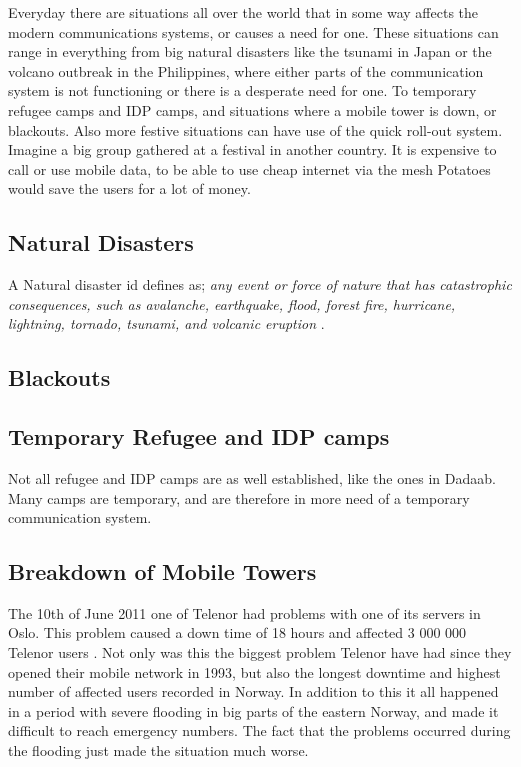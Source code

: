 Everyday there are situations all over the world that in some way affects the modern communications systems, or causes a need for one. These situations can range in everything from big natural disasters like the tsunami in Japan or the volcano outbreak in the Philippines, where either parts of the communication system is not functioning or there is a desperate need for one. To temporary refugee camps and IDP camps, and situations where a mobile tower is down, or blackouts. Also more festive situations can have use of the quick roll-out system. Imagine a big group gathered at a festival in another country. It is expensive to call or use mobile data, to be able to use cheap internet via the mesh Potatoes would save the users for a lot of money. 

\subsection{Natural Disasters}
A Natural disaster id defines as; \textit{any event or force of nature that has catastrophic consequences, such as avalanche, earthquake, flood, forest fire, hurricane, lightning, tornado, tsunami, and volcanic eruption} \cite{naturalDisaster}.


\subsection{Blackouts}

\subsection{Temporary Refugee and IDP camps}
Not all refugee and IDP camps are as well established, like the ones in Dadaab. Many camps are temporary, and are therefore in more need of a temporary communication system. 

\subsection{Breakdown of Mobile Towers}


The 10th of June 2011 one of Telenor had problems with one of its servers in Oslo. This problem caused a down time of 18 hours and affected 3 000 000 Telenor users \cite{listeNedetid}. Not only was this the biggest problem Telenor have had since they opened their mobile network in 1993, but also the longest downtime and highest number of affected users recorded in Norway. In addition to this it all happened in a period with severe flooding in big parts of the eastern Norway, and made it difficult to reach emergency numbers. The fact that the problems occurred during the flooding just made the situation much worse. \cite{TelenorNede}

